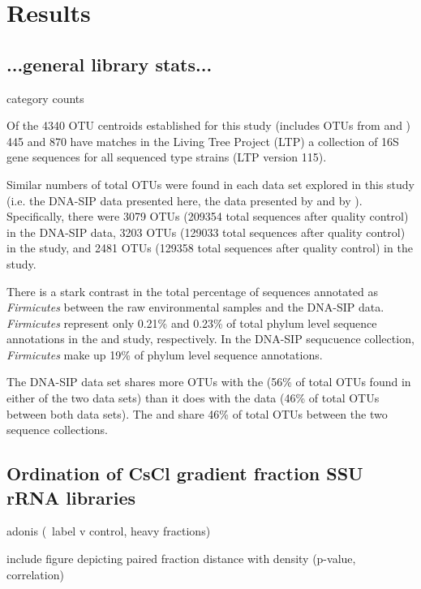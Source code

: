 \section{Results}

\subsection{...general library stats...}

category counts

Of the 4340 OTU centroids established for this study (includes OTUs from \citet{Steven_2013} and \cite{Garcia_Pichel_2013}) 445 and 870 have matches in the Living Tree Project (LTP) a collection of 16S gene sequences for all sequenced type strains \cite{Yarza_2008} (LTP version 115).

Similar numbers of total OTUs were found in each data set explored in this study (i.e. the DNA-SIP data presented here, the data presented by \citet{Steven_2013} and by \citet{Garcia_Pichel_2013}). Specifically, there were 3079 OTUs (209354 total sequences after quality control) in the DNA-SIP data, 3203 OTUs (129033 total sequences after quality control) in the \citet{Garcia_Pichel_2013} study, and 2481 OTUs (129358 total sequences after quality control) in the \citet{Steven_2013} study.

There is a stark contrast in the total percentage of sequences annotated as \textit{Firmicutes} between the raw environmental samples and the DNA-SIP data. \textit{Firmicutes} represent only 0.21\% and 0.23\% of total phylum level sequence annotations in the \citet{Steven_2013} and \citet{Garcia_Pichel_2013} study, respectively. In the DNA-SIP sequcuence collection, \textit{Firmicutes} make up 19\% of phylum level sequence annotations.

The DNA-SIP data set shares more OTUs with the \citet{Steven_2013} (56\% of total OTUs found in either of the two data sets) than it does with the \citet{Garcia_Pichel_2013} data (46\% of total OTUs between both data sets). The \cite{Steven_2013} and \cite{Garcia_Pichel_2013} share 46\% of total OTUs between the two sequence collections.

\subsection{Ordination of CsCl gradient fraction SSU rRNA libraries}

adonis (~label v control, heavy fractions)

include figure depicting paired fraction distance with density (p-value, correlation)

